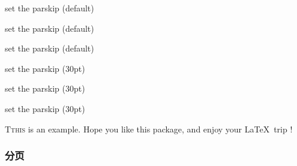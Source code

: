\documentclass[twoside]{ctexart}
\begin{document}
            \setlength{\parskip}{0pt plus 1pt} %

            set the parskip (default)

            set the parskip (default)

            set the parskip (default)

            {\setlength{\parskip}{30pt}
            
            set the parskip (30pt)

            set the parskip (30pt)

            set the parskip (30pt)
            }

            \lettrine{T}{this} is an example. Hope you like this package, and enjoy your \LaTeX\ trip !
            
        \subsubsection{分页}
            \newpage %
            \mbox{}
            \newpage
        
\end{document}
